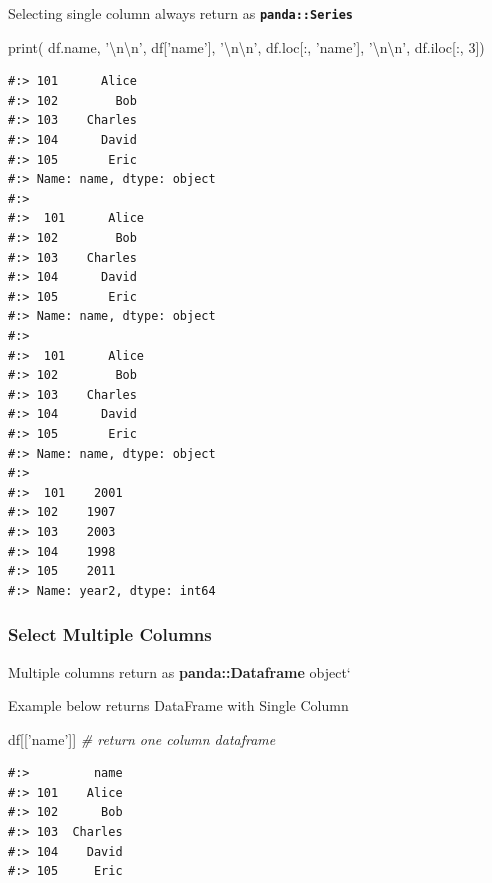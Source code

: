 \documentclass[
]{book}
\newenvironment{Shaded}{\begin{snugshade}}{\end{snugshade}}
\newcommand{\BuiltInTok}[1]{#1}
\newcommand{\CharTok}[1]{\textcolor[rgb]{0.5,0.5,0.5}{#1}}
\newcommand{\CommentTok}[1]{\textcolor[rgb]{0.37,0.37,0.37}{\textit{#1}}}
\newcommand{\DecValTok}[1]{\textcolor[rgb]{0.06,0.06,0.06}{#1}}
\newcommand{\NormalTok}[1]{#1}
\newcommand{\StringTok}[1]{\textcolor[rgb]{0.5,0.5,0.5}{#1}}
\begin{document}
Selecting single column always return as \textbf{\texttt{panda::Series}}

\begin{Shaded}
\begin{Highlighting}[]
\BuiltInTok{print}\NormalTok{( }
\NormalTok{  df.name,           }\StringTok{'}\CharTok{\textbackslash{}n\textbackslash{}n}\StringTok{'}\NormalTok{,}
\NormalTok{  df[}\StringTok{'name'}\NormalTok{],        }\StringTok{'}\CharTok{\textbackslash{}n\textbackslash{}n}\StringTok{'}\NormalTok{,}
\NormalTok{  df.loc[:, }\StringTok{'name'}\NormalTok{], }\StringTok{'}\CharTok{\textbackslash{}n\textbackslash{}n}\StringTok{'}\NormalTok{,}
\NormalTok{  df.iloc[:, }\DecValTok{3}\NormalTok{])}
\end{Highlighting}
\end{Shaded}

\begin{verbatim}
#:> 101      Alice
#:> 102        Bob
#:> 103    Charles
#:> 104      David
#:> 105       Eric
#:> Name: name, dtype: object 
#:> 
#:>  101      Alice
#:> 102        Bob
#:> 103    Charles
#:> 104      David
#:> 105       Eric
#:> Name: name, dtype: object 
#:> 
#:>  101      Alice
#:> 102        Bob
#:> 103    Charles
#:> 104      David
#:> 105       Eric
#:> Name: name, dtype: object 
#:> 
#:>  101    2001
#:> 102    1907
#:> 103    2003
#:> 104    1998
#:> 105    2011
#:> Name: year2, dtype: int64
\end{verbatim}

\hypertarget{select-multiple-columns}{%
\subsubsection{Select Multiple Columns}\label{select-multiple-columns}}

Multiple columns return as \textbf{panda::Dataframe} object`

Example below returns DataFrame with Single Column

\begin{Shaded}
\begin{Highlighting}[]
\NormalTok{df[[}\StringTok{'name'}\NormalTok{]]  }\CommentTok{# return one column dataframe}
\end{Highlighting}
\end{Shaded}

\begin{verbatim}
#:>         name
#:> 101    Alice
#:> 102      Bob
#:> 103  Charles
#:> 104    David
#:> 105     Eric
\end{verbatim}
\end{document}
